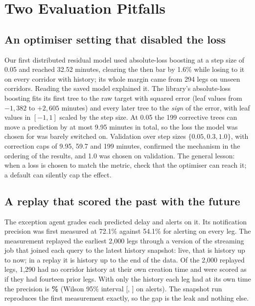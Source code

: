 \section{Two Evaluation Pitfalls}\label{sec:pitfalls}

\subsection{An optimiser setting that disabled the loss}\label{sec:optimiser}
Our first distributed residual model used absolute-loss boosting at a step size of 0.05 and reached 32.52 minutes, clearing the then bar by 1.6\% while losing to it on every corridor with history; its whole margin came from 294 legs on unseen corridors. Reading the saved model explained it. The library's absolute-loss boosting fits its first tree to the raw target with squared error (leaf values from $-1{,}382$ to $+2{,}605$ minutes) and every later tree to the \emph{sign} of the error, with leaf values in $[-1,1]$ scaled by the step size. At 0.05 the 199 corrective trees can move a prediction by at most 9.95 minutes in total, so the loss the model was chosen for was barely switched on. Validation over step sizes $\{0.05,0.3,1.0\}$, with correction caps of 9.95, 59.7 and 199 minutes, confirmed the mechanism in the ordering of the results, and 1.0 was chosen on validation. The general lesson: when a loss is chosen to match the metric, check that the optimiser can reach it; a default can silently cap the effect.

\subsection{A replay that scored the past with the future}\label{sec:replay}
The exception agent grades each predicted delay and alerts on it. Its notification precision was first measured at 72.1\% against 54.1\% for alerting on every leg. The measurement replayed the earliest 2,000 legs through a version of the streaming job that joined each query to the latest history snapshot: live, that is history up to now; in a replay it is history up to the end of the data. Of the 2,000 replayed legs, 1,290 had no corridor history at their own creation time and were scored as if they had fourteen prior legs. With only the history each leg had at its own time the precision is \textbf{\fzExcPrecisionAsOfRatePct{}\%} (Wilson 95\% interval [\fzExcPrecisionCiLowPct{}, \fzExcPrecisionCiHighPct{}] on \fzExcAlerts{} alerts). The snapshot run reproduces the first measurement exactly, so the gap is the leak and nothing else.

